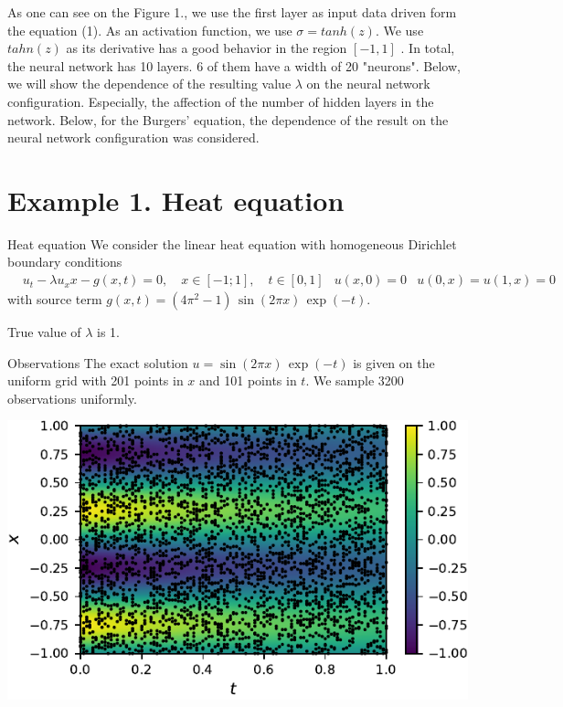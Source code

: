 \documentclass{beamer}
\def\\{}%
\begin{document}
\begin{frame}

As one can see on the Figure 1., we use the first layer as input data driven
form the equation (1). As an activation function, we use $\sigma = tanh(z)$. We
use $tahn(z)$ as its derivative has a good behavior in the region $[-1, 1]$
\cite{nndesign}. In total, the neural network has 10 layers. 6 of them have a
width of 20 "neurons". Below, we will show the dependence of the resulting value
$\lambda$ on the neural network configuration. Especially, the affection of the
number of hidden layers in the network. Below, for the Burgers' equation, the dependence of the result on the neural network configuration was considered.
    
\end{frame}




\section{Example 1. Heat equation}

\begin{frame}{Heat equation}
    We consider the linear heat equation with homogeneous Dirichlet boundary
    conditions
\begin{align*}
    &u_t - \lambda u_xx - g(x, t) = 0, \quad x\in[-1; 1], \quad t\in[0, 1] \\
    &u(x, 0) = 0 \\
    &u(0, x) = u(1, x) = 0
\end{align*}
with source term $g(x, t) = (4\pi^2 -1) \, \sin(2\pi x) \, \exp(-t)$.

True value of $\lambda$ is 1.
\end{frame}

\begin{frame}{Observations}
The exact solution $u = \sin(2\pi x) \, \exp(-t)$ is given on the uniform grid
with 201 points in $x$ and 101 points in $t$. 
We sample 3200 observations uniformly.

\centering
\includegraphics{images/heateq-observations}
\end{frame}
\end{document}
